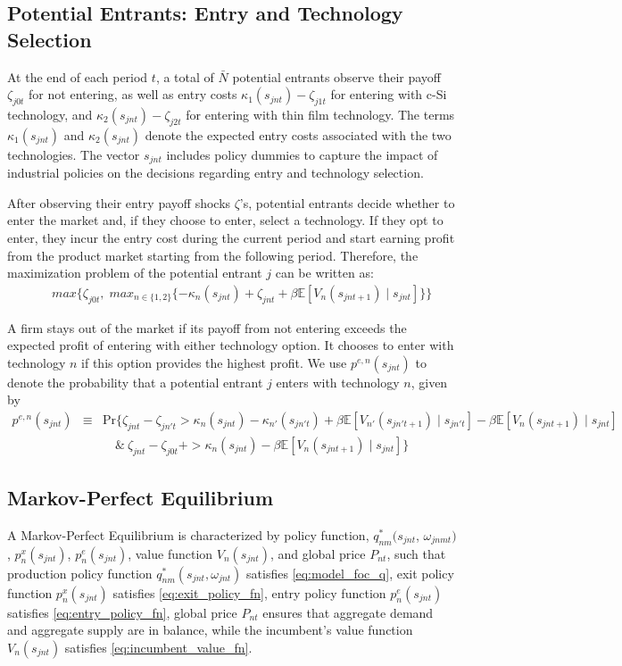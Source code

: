 \documentclass[12pt, letter]{article}
\begin{document}
\subsection{Potential Entrants: Entry and Technology Selection}
At the end of each period $t$, a total of $\bar N$ potential entrants observe their payoff $\zeta_{j0t}$ for not entering, as well as entry costs $\kappa_1(s_{jnt})-\zeta_{j1t}$ for entering with c-Si technology, and $\kappa_2(s_{jnt})-\zeta_{j2t}$ for entering with thin film technology. The terms $\kappa_1(s_{jnt})$ and $\kappa_2(s_{jnt})$ denote the expected entry costs associated with the two technologies. The vector $s_{jnt}$ includes policy dummies to capture the impact of industrial policies on the decisions regarding entry and technology selection.

After observing their entry payoff shocks $\zeta$'s, potential entrants decide whether to enter the market and, if they choose to enter, select a technology. If they opt to enter, they incur the entry cost during the current period and start earning profit from the product market starting from the following period. Therefore, the maximization problem of the potential entrant $j$ can be written as:
\begin{eqnarray}
 && max\Big\{\zeta_{j0t}, \; max_{n\in \{1,2\}} \{-\kappa_n(s_{jnt}) + \zeta_{jnt} + \beta \mathbb{E}[V_n(s_{jnt+1}) \mid s_{jnt}]\} \Big\}
\end{eqnarray}

A firm stays out of the market if its payoff from not entering exceeds the expected profit of entering with either technology option. It chooses to enter with technology $n$ if this option provides the highest profit. We use $p^{e,n}(s_{jnt})$ to denote the probability that a potential entrant $j$ enters with technology $n$, given by
\begin{eqnarray}
  p^{e,n}(s_{jnt}) & \equiv & \text{Pr}\Big\{\zeta_{jnt} - \zeta_{jn't}  > \kappa_n(s_{jnt})-\kappa_{n'}(s_{jn't}) + \beta \mathbb{E}[V_{n'}(s_{jn't+1}) \mid s_{jn't}] - \beta \mathbb{E}[V_n(s_{jnt+1}) \mid s_{jnt}] \nonumber \\
  & & \quad  \& \  \zeta_{jnt}-\zeta_{j0t} + >\kappa_n(s_{jnt})-\beta \mathbb{E}[V_n(s_{jnt+1}) \mid s_{jnt}] \Big\} \label{eq:entry_policy_fn}
\end{eqnarray}

\subsection{Markov-Perfect Equilibrium}
A Markov-Perfect Equilibrium is characterized by policy function, $q^*_{nm}(s_{jnt}$, $\omega_{jnmt})$, $p_n^x(s_{jnt})$, $p_n^e(s_{jnt})$, value function $V_n(s_{jnt})$, and global price $P_{nt}$, such that production policy function $q^*_{nm}(s_{jnt},\omega_{jnt})$ satisfies \eqref{eq:model_foc_q}, exit policy function $p_n^x(s_{jnt})$ satisfies \eqref{eq:exit_policy_fn}, entry policy function $p_n^e(s_{jnt})$ satisfies \eqref{eq:entry_policy_fn}, global price $P_{nt}$ ensures that aggregate demand and aggregate supply are in balance, while the incumbent's value function $V_n(s_{jnt})$ satisfies \eqref{eq:incumbent_value_fn}.
\end{document}
